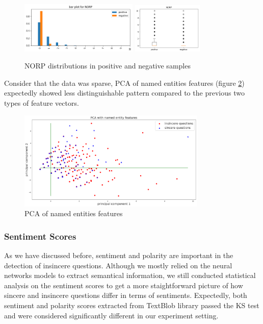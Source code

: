 \documentclass[12pt]{diazessay} %
\begin{document}
{\begin{figure}[!htbp]
    \centering
    \includegraphics[width=0.5\textwidth]{graphs/bar_norp.png}
    \includegraphics[width=0.3\textwidth]{graphs/norp_box.png}
    \caption{NORP distributions in positive and negative samples}
    \label{figure:norp}
\end{figure}

Consider that the data was sparse, PCA of named entities features (figure \ref{figure:entpca}) expectedly showed less distinguishable pattern compared to the previous two types of feature vectors. 

\begin{figure}[!htbp]
    \includegraphics[width=0.8\textwidth, center]{graphs/pca/2Dent.png}
    \caption{PCA of named entities features} 
    \label{figure:entpca}
\end{figure}


\subsubsection{Sentiment Scores} %
\label{ssub:sentiment_scores}

As we have discussed before, sentiment and polarity are important in the detection of insincere questions. Although we mostly relied on the neural networks models to extract semantical information, we still conducted statistical analysis on the sentiment scores to get a more staightforward picture of how sincere and insincere questions differ in terms of sentiments. Expectedly, both sentiment and polarity scores extracted from TextBlob library passed the KS test and were considered significantly different in our experiment setting. 

}
\end{document}
